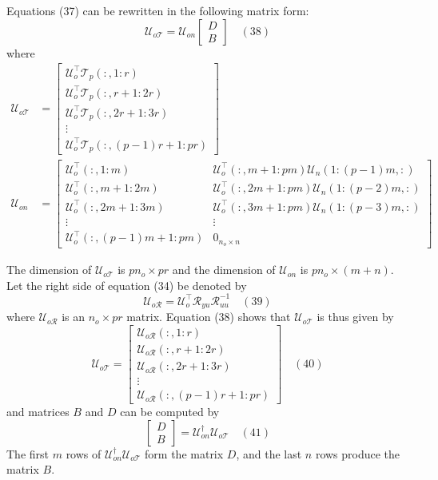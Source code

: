 Equations (37) can be rewritten in the following matrix form: 
\[
    \mathcal{U}_{o\mathcal{T}}=\mathcal{U}_{on}\begin{bmatrix}
        D\\B
    \end{bmatrix}\quad (38)
\]
where 
\begin{align*}
    \mathcal{U}_{o\mathcal{T}}&=\begin{bmatrix}
        \mathcal{U}_o^\top\mathcal{T}_p(:,1:r)\\
        \mathcal{U}_o^\top\mathcal{T}_p(:,r+1:2r)\\
        \mathcal{U}_o^\top\mathcal{T}_p(:,2r+1:3r)\\
        \vdots\\
        \mathcal{U}_o^\top\mathcal{T}_p(:,(p-1)r+1:pr)
    \end{bmatrix}\\
    \mathcal{U}_{on}&=\begin{bmatrix}
        \mathcal{U}_o^\top(:,1:m)&\mathcal{U}_o^\top(:,m+1:pm)\mathcal{U}_n(1:(p-1)m,:)\\
        \mathcal{U}_o^\top(:,m+1:2m)&\mathcal{U}_o^\top(:,2m+1:pm)\mathcal{U}_n(1:(p-2)m,:)\\
        \mathcal{U}_o^\top(:,2m+1:3m)&\mathcal{U}_o^\top(:,3m+1:pm)\mathcal{U}_n(1:(p-3)m,:)\\
        \vdots&\vdots\\
        \mathcal{U}_o^\top(:,(p-1)m+1:pm)&0_{n_o\times n}
    \end{bmatrix}
\end{align*}

The dimension of $\mathcal{U}_{o\mathcal{T}}$ is $pn_o\times pr$ and the dimension of $\mathcal{U}_{on}$ is $pn_o\times (m+n)$. 
Let the right side of equation (34) be denoted by 
\[
    \mathcal{U}_{o\mathcal{R}}=\mathcal{U}_o^\top\mathcal{R}_{yu}\mathcal{R}_{uu}^{-1}\quad (39)
\]
where $\mathcal{U}_{o\mathcal{R}}$ is an $n_o\times pr$ matrix. 
Equation (38) shows that $\mathcal{U}_{o\mathcal{T}}$ is thus given by 
\[
    \mathcal{U}_{o\mathcal{T}}=\begin{bmatrix}
        \mathcal{U}_{o\mathcal{R}}(:,1:r)\\
        \mathcal{U}_{o\mathcal{R}}(:,r+1:2r)\\
        \mathcal{U}_{o\mathcal{R}}(:,2r+1:3r)\\
        \vdots\\
        \mathcal{U}_{o\mathcal{R}}(:,(p-1)r+1:pr)
    \end{bmatrix}
    \quad (40)
\]
and matrices $B$ and $D$ can be computed by 
\[
    \begin{bmatrix}
        D\\B
    \end{bmatrix}
    =\mathcal{U}_{on}^\dagger\mathcal{U}_{o\mathcal{T}}
    \quad (41)
\]
The first $m$ rows of $\mathcal{U}_{on}^\dagger\mathcal{U}_{o\mathcal{T}}$ form the matrix $D$, and the last $n$ rows produce the matrix $B$. 

